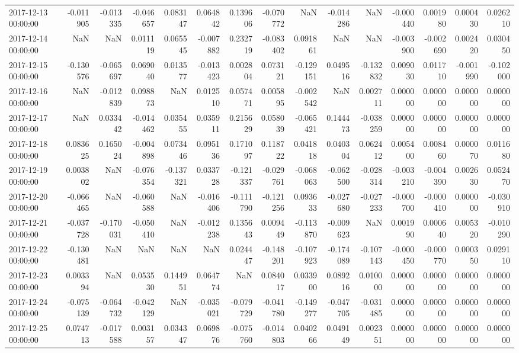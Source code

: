 \begin{tabular}{lrrrrrrrrrrrrrr}
2017-12-13 00:00:00 & -0.011905 & -0.013335 & -0.046657 & 0.083147 & 0.064842 & 0.139606 & -0.070772 & NaN & -0.014286 & NaN & -0.000440 & 0.001980 & 0.000430 & 0.026210 \\
2017-12-14 00:00:00 & NaN & NaN & 0.011119 & 0.065545 & -0.007882 & 0.232719 & -0.083402 & 0.091861 & NaN & NaN & -0.003900 & -0.002690 & 0.002420 & 0.030450 \\
2017-12-15 00:00:00 & -0.130576 & -0.065697 & 0.069040 & 0.013577 & -0.013423 & 0.002804 & 0.073121 & -0.129151 & 0.049516 & -0.132832 & 0.009030 & 0.011710 & -0.001990 & -0.102000 \\
2017-12-16 00:00:00 & NaN & -0.012839 & 0.098873 & NaN & 0.012510 & 0.057471 & 0.005895 & -0.002542 & NaN & 0.002711 & 0.000000 & 0.000000 & 0.000000 & 0.000000 \\
2017-12-17 00:00:00 & NaN & 0.033442 & -0.014462 & 0.035455 & 0.035911 & 0.215629 & 0.058039 & -0.065421 & 0.144473 & -0.038259 & 0.000000 & 0.000000 & 0.000000 & 0.000000 \\
2017-12-18 00:00:00 & 0.083625 & 0.165024 & -0.004898 & 0.073446 & 0.095136 & 0.171097 & 0.118722 & 0.041818 & 0.040304 & 0.062412 & 0.005400 & 0.008460 & 0.000070 & 0.011680 \\
2017-12-19 00:00:00 & 0.003802 & NaN & -0.076354 & -0.137321 & 0.033728 & -0.121337 & -0.029761 & -0.068063 & -0.062500 & -0.028314 & -0.003210 & -0.004390 & 0.002630 & 0.052470 \\
2017-12-20 00:00:00 & -0.066465 & NaN & -0.060588 & NaN & -0.016406 & -0.111790 & -0.121256 & 0.093633 & -0.027680 & -0.027233 & -0.000700 & -0.000410 & 0.000000 & -0.030910 \\
2017-12-21 00:00:00 & -0.037728 & -0.170031 & -0.050410 & NaN & -0.012238 & 0.135643 & 0.009449 & -0.113870 & -0.009623 & NaN & 0.001990 & 0.000640 & 0.005320 & -0.010290 \\
2017-12-22 00:00:00 & -0.130481 & NaN & NaN & NaN & NaN & 0.024447 & -0.148201 & -0.107923 & -0.174089 & -0.107143 & -0.000450 & -0.000770 & 0.000350 & 0.029110 \\
2017-12-23 00:00:00 & 0.003394 & NaN & 0.053530 & 0.144951 & 0.064774 & NaN & 0.084017 & 0.033900 & 0.089216 & 0.010000 & 0.000000 & 0.000000 & 0.000000 & 0.000000 \\
2017-12-24 00:00:00 & -0.075139 & -0.064732 & -0.042129 & NaN & -0.035021 & -0.079729 & -0.041780 & -0.149277 & -0.047705 & -0.031485 & 0.000000 & 0.000000 & 0.000000 & 0.000000 \\
2017-12-25 00:00:00 & 0.074713 & -0.017588 & 0.003157 & 0.034347 & 0.069876 & -0.075760 & -0.014803 & 0.040266 & 0.049149 & 0.002351 & 0.000000 & 0.000000 & 0.000000 & 0.000000 \\

\end{tabular}
